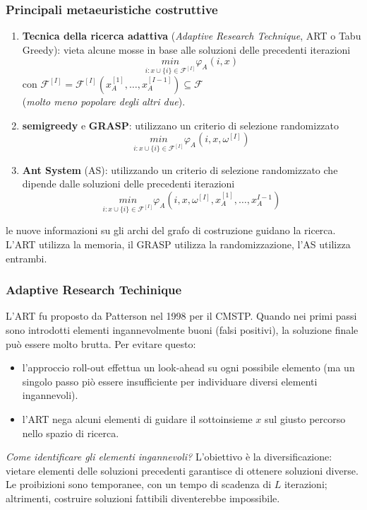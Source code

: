 \documentclass{article}
\begin{document}
\subsubsection{Principali metaeuristiche costruttive}
\begin{enumerate}
    \item \textbf{Tecnica della ricerca adattiva} (\textit{Adaptive Research Technique}, ART o Tabu Greedy):
    vieta alcune mosse in base alle soluzioni delle precedenti iterazioni
    $$\underset{i:x\cup\{i\}\in\mathcal{F}^{[I]}}{min}\varphi_A(i,x)$$
    con $\mathcal{F}^{[I]}=\mathcal{F}^{[I]}\left(x_A^{[1]},\dots, x_A^{[I-1]}\right)\subseteq\mathcal{F}$
    \\(\textit{molto meno popolare degli altri due}).
    \item \textbf{semigreedy} e \textbf{GRASP}: utilizzano un criterio di selezione randomizzato
    $$\underset{i:x\cup\{i\}\in\mathcal{F}^{[I]}}{min}\varphi_A\left(i,x,\omega^{[I]}\right)$$

    \item \textbf{Ant System} (AS): utilizzando un criterio di selezione randomizzato che dipende
    dalle soluzioni delle precedenti iterazioni
    $$\underset{i:x\cup\{i\}\in\mathcal{F}^{[I]}}{min}\varphi_A\left(i,x,\omega^{[I]},x_A^{[1]},\dots,x_A^{I-1}\right)$$

\end{enumerate}
le nuove informazioni su gli archi del grafo di costruzione guidano la ricerca. L'ART utilizza la memoria,
il GRASP utilizza la randomizzazione, l'AS utilizza entrambi.

\subsubsection{Adaptive Research Techinique}
L'ART fu proposto da Patterson nel 1998 per il CMSTP. Quando nei primi passi sono introdotti
elementi ingannevolmente buoni (falsi positivi), la soluzione finale può essere molto brutta.
Per evitare questo:
\begin{itemize}
    \item l'approccio roll-out effettua un look-ahead su ogni possibile elemento
    (ma un singolo passo piò essere insufficiente per individuare diversi elementi ingannevoli).
    \item l'ART nega alcuni elementi di guidare il sottoinsieme $x$ sul giusto percorso nello
    spazio di ricerca.
\end{itemize}
\textit{Come identificare gli elementi ingannevoli?} L'obiettivo è la diversificazione: vietare
elementi delle soluzioni precedenti garantisce di ottenere soluzioni diverse. Le proibizioni
sono temporanee, con un tempo di scadenza di $L$ iterazioni; altrimenti, costruire soluzioni
fattibili diventerebbe impossibile.
\end{document}
